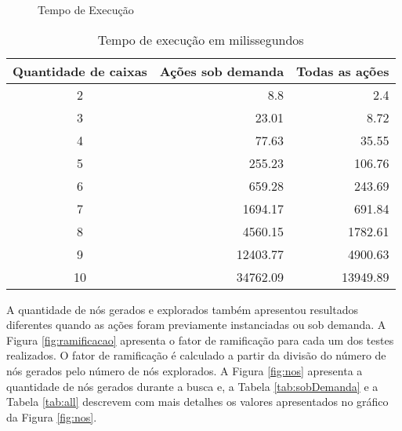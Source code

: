 \documentclass[12pt,a4paper]{article}
\begin{document}
\begin{figure}[H]
\centering
{}
\caption{Tempo de Execução}
\label{fig:time}
\end{figure}


\begin{table}[H]
\centering
\scriptsize
\begin{tabular}{|c|r|r|}
\hline
\textbf{Quantidade de caixas}&\textbf{Ações sob demanda}&\textbf{Todas as 
ações}	\\ \hline
2	&	8.8	&	2.4	\\ \hline
3	&	23.01	&	8.72	\\ \hline
4	&	77.63	&	35.55	\\ \hline
5	&	255.23	&	106.76	\\ \hline
6	&	659.28	&	243.69	\\ \hline
7	&	1694.17	&	691.84	\\ \hline
8	&	4560.15	&	1782.61	\\ \hline
9	&	12403.77	&	4900.63	\\ \hline
10	&	34762.09	&	13949.89	\\ \hline

\end{tabular}
\caption{Tempo de execução em milissegundos}
\label{tab:time}
\end{table}

A quantidade de nós gerados e explorados também apresentou resultados diferentes quando as ações foram previamente instanciadas ou sob demanda. A Figura \ref{fig:ramificacao} apresenta o fator de ramificação para cada um dos testes realizados. O fator de ramificação é calculado a partir da divisão do número de nós gerados pelo número de nós explorados. A Figura \ref{fig:nos} apresenta a quantidade de nós gerados durante a busca e, a Tabela \ref{tab:sobDemanda} e a Tabela \ref{tab:all} descrevem com mais detalhes os valores apresentados no gráfico da Figura \ref{fig:nos}.
\end{document}
